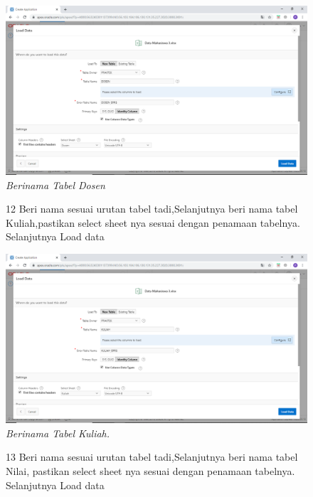 \begin{enumerate}
\begin{figure}
    \begin{center}
    \includegraphics[scale=0.3]{figures/101.png}
    \caption{\textit{Berinama Tabel Dosen}}
    \end{center}
    \label{gambar}
    \end{figure}

\begin{figure}
\item[12]Beri nama sesuai urutan tabel tadi,Selanjutnya beri nama tabel Kuliah,pastikan select sheet nya sesuai dengan penamaan tabelnya. Selanjutnya Load data

    \begin{center}
    \includegraphics[scale=0.3]{figures/151.png}
    \caption{\textit{Berinama Tabel Kuliah.}}
     \end{center}
    \label{gambar}
    \end{figure}


\begin{figure}
\item[13]Beri nama sesuai urutan tabel tadi,Selanjutnya beri nama tabel Nilai, pastikan select sheet nya sesuai dengan penamaan tabelnya. Selanjutnya Load data


\end{figure}
\end{enumerate}
